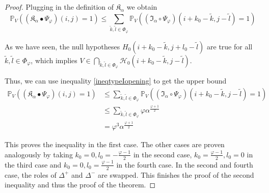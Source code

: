 \documentclass[a4paper,12pt]{article}
\theoremstyle{plain}
\theoremstyle{definition}
\begin{document}
\begin{proof}
	Plugging in the definition of $\mathfrak{K}_\alpha$ we obtain
	\begin{equation*}
		\mathbb{P}_V( (\mathfrak{K}_\alpha \bullet \Psi_\varphi)(i, j) = 1 ) \leq \sum_{\tilde{k}, \tilde{l} \in \Phi_\varphi} \mathbb{P}_V\left( (\mathfrak{I}_\alpha \circ \Psi_\varphi)(i + k_0 - \tilde{k}, j - \tilde{l}) = 1 \right)
	\end{equation*}
	
	As we have seen, the null hypotheses $H_0(i + k_0 - \tilde{k}, j + l_0 - \tilde{l})$ are true for all $\tilde{k}, \tilde{l} \in \Phi_\varphi$, which implies $V \in \bigcap_{\tilde{k}, \tilde{l} \in \Phi_\varphi} \mathcal{H}_0(i + k_0 - \tilde{k}, j - \tilde{l})$.
	
	Thus, we can use inequality \eqref{ineqtypeIopening} to get the upper bound
	\begin{align*}
		\mathbb{P}_V( (\mathfrak{K}_\alpha \bullet \Psi_\varphi)(i, j) = 1 ) &\leq \sum_{\tilde{k}, \tilde{l} \in \Phi_\varphi} \mathbb{P}_V\left( (\mathfrak{I}_\alpha \circ \Psi_\varphi)(i + k_0 - \tilde{k}, j - \tilde{l}) = 1 \right) \\
		&\leq \sum_{\tilde{k}, \tilde{l} \in \Phi_\varphi} \varphi \alpha^{\frac{\varphi + 1}{2}} \\
		&= \varphi^3 \alpha^{\frac{\varphi + 1}{2}}
	\end{align*}
	
	This proves the inequality in the first case. The other cases are proven analogously by taking $k_0 = 0, l_0 = -\frac{\varphi - 1}{2}$ in the second case, $k_0 = \frac{\varphi - 1}{2}, l_0 = 0$ in the third case and $k_0 = 0, l_0 = \frac{\varphi - 1}{2}$ in the fourth case. In the second and fourth case, the roles of $\Delta^+$ and $\Delta^-$ are swapped. This finishes the proof of the second inequality and thus the proof of the theorem.
\end{proof}

\newpage
\end{document}
